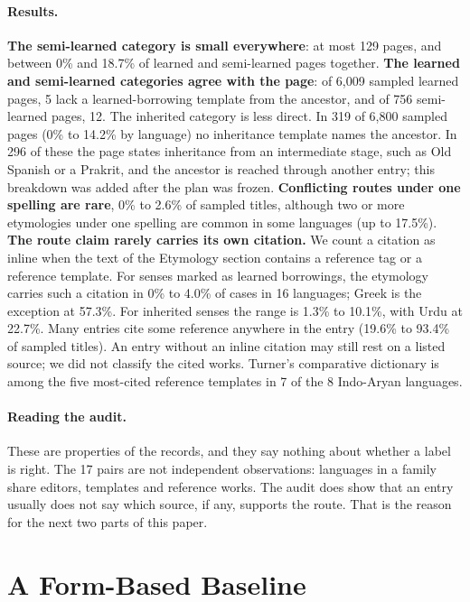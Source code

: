 \documentclass[11pt]{article}
\begin{document}
\paragraph{Results.} \textbf{The semi-learned category is small everywhere}: at most 129 pages, and between 0\% and 18.7\% of learned and semi-learned pages together. \textbf{The learned and semi-learned categories agree with the page}: of 6,009 sampled learned pages, 5 lack a learned-borrowing template from the ancestor, and of 756 semi-learned pages, 12. The inherited category is less direct. In 319 of 6,800 sampled pages (0\% to 14.2\% by language) no inheritance template names the ancestor. In 296 of these the page states inheritance from an intermediate stage, such as Old Spanish or a Prakrit, and the ancestor is reached through another entry; this breakdown was added after the plan was frozen. \textbf{Conflicting routes under one spelling are rare}, 0\% to 2.6\% of sampled titles, although two or more etymologies under one spelling are common in some languages (up to 17.5\%). \textbf{The route claim rarely carries its own citation.} We count a citation as inline when the text of the Etymology section contains a reference tag or a reference template. For senses marked as learned borrowings, the etymology carries such a citation in 0\% to 4.0\% of cases in 16 languages; Greek is the exception at 57.3\%. For inherited senses the range is 1.3\% to 10.1\%, with Urdu at 22.7\%. Many entries cite some reference anywhere in the entry (19.6\% to 93.4\% of sampled titles). An entry without an inline citation may still rest on a listed source; we did not classify the cited works. Turner's comparative dictionary is among the five most-cited reference templates in 7 of the 8 Indo-Aryan languages.

\paragraph{Reading the audit.} These are properties of the records, and they say nothing about whether a label is right. The 17 pairs are not independent observations: languages in a family share editors, templates and reference works. The audit does show that an entry usually does not say which source, if any, supports the route. That is the reason for the next two parts of this paper.

\section{A Form-Based Baseline}
\label{sec:baseline}
\end{document}

